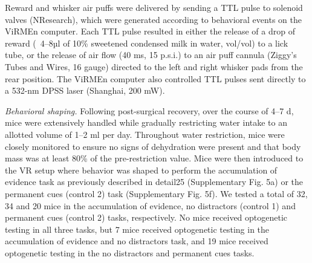 Reward and whisker air puffs were delivered by sending a TTL pulse to solenoid valves (NResearch), which were generated according to behavioral events on the ViRMEn computer. Each TTL pulse resulted in either the release of a drop of reward (~4–8µl of 10\% sweetened condensed milk in water, vol/vol) to a lick tube, or the release of air flow (40 ms, 15 p.s.i.) to an air puff cannula (Ziggy’s Tubes and Wires, 16 gauge) directed to the left and right whisker pads from the rear position. The ViRMEn computer also controlled TTL pulses sent directly to a 532-nm DPSS laser (Shanghai, 200 mW).

\textit{Behavioral shaping.} Following post-surgical recovery, over the course of 4–7 d, mice were extensively handled while gradually restricting water intake to an allotted volume of 1–2 ml per day. Throughout water restriction, mice were closely monitored to ensure no signs of dehydration were present and that body mass was at least 80\% of the pre-restriction value. Mice were then introduced to the VR setup where behavior was shaped to perform the accumulation of evidence task as previously described in detail25 (Supplementary Fig. 5a) or the permanent cues (control 2) task (Supplementary Fig. 5f). We tested a total of 32, 34 and 20 mice in the accumulation of evidence, no distractors (control 1) and permanent cues (control 2) tasks, respectively. No mice received optogenetic testing in all three tasks, but 7 mice received optogenetic testing in the accumulation of evidence and no distractors task, and 19 mice received optogenetic testing in the no distractors and permanent cues tasks.\\
